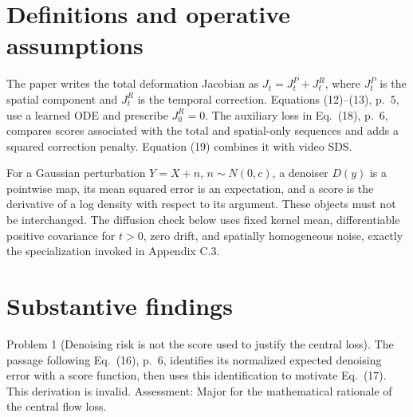 \documentclass[10pt]{article}
\begin{document}
\section*{Definitions and operative assumptions}
The paper writes the total deformation Jacobian as \(J_t=J_t^P+J_t^R\), where \(J_t^P\) is the spatial component and \(J_t^R\) is the temporal correction. Equations (12)–(13), p. 5, use a learned ODE and prescribe \(J_0^R=0\). The auxiliary loss in Eq. (18), p. 6, compares scores associated with the total and spatial-only sequences and adds a squared correction penalty. Equation (19) combines it with video SDS.\par
For a Gaussian perturbation \(Y=X+n\), \(n\sim N(0,c)\), a denoiser \(D(y)\) is a pointwise map, its mean squared error is an expectation, and a score is the derivative of a log density with respect to its argument. These objects must not be interchanged. The diffusion check below uses fixed kernel mean, differentiable positive covariance for \(t>0\), zero drift, and spatially homogeneous noise, exactly the specialization invoked in Appendix C.3.\par
\section*{Substantive findings}
Problem 1 (Denoising risk is not the score used to justify the central loss).  The passage following Eq. (16), p. 6, identifies its normalized expected denoising error with a score function, then uses this identification to motivate Eq. (17). This derivation is invalid. Assessment: Major for the mathematical rationale of the central flow loss.\par
\end{document}

